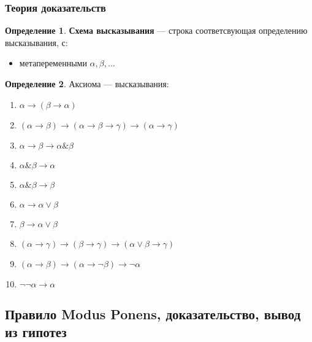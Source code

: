 \documentclass[english]{article}
\theoremstyle{plain}
\theoremstyle{remark}
\theoremstyle{definition}
\newtheorem*{definition}{Определение}
\begin{document}
\subsubsection{Теория доказательств}
\label{sec:orge6e7887}
\begin{definition}
\textbf{Схема высказывания} --- строка соответсвующая определению высказывания, с:
\begin{itemize}
\item метапеременными \(\alpha, \beta, \dots\)
\end{itemize}
\end{definition}
\begin{definition}
Аксиома --- высказывания:
\begin{enumerate}
\item \(\alpha \to (\beta \to \alpha)\)
\item \((\alpha \to \beta) \to (\alpha \to \beta \to \gamma) \to (\alpha \to \gamma)\)
\item \(\alpha \to \beta \to \alpha \& \beta\)
\item \(\alpha \& \beta \to \alpha\)
\item \(\alpha \& \beta \to \beta\)
\item \(\alpha \to \alpha \vee \beta\)
\item \(\beta \to \alpha \vee \beta\)
\item \((\alpha \to \gamma) \to (\beta \to \gamma) \to (\alpha \vee \beta \to \gamma)\)
\item \((\alpha \to \beta) \to (\alpha \to \neg \beta) \to \neg \alpha\)
\item \(\neg\neg \alpha \to \alpha\)
\end{enumerate}
\end{definition}
\subsection{Правило Modus Ponens, доказательство, вывод из гипотез}
\label{sec:org232952d}
\end{document}
